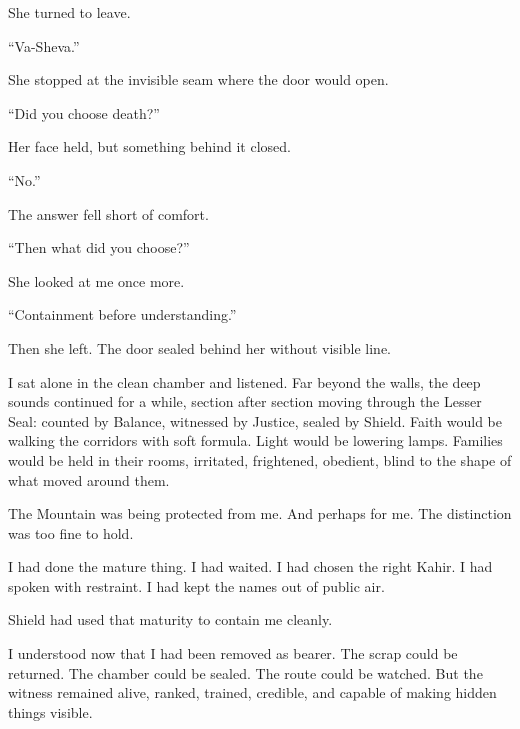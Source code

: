 She turned to leave.\par

``Va-Sheva.''\par

She stopped at the invisible seam where the door would open.\par

``Did you choose death?''\par

Her face held, but something behind it closed.\par

``No.''\par

The answer fell short of comfort.\par

``Then what did you choose?''\par

She looked at me once more.\par

``Containment before understanding.''\par

Then she left. The door sealed behind her without visible line.\par

I sat alone in the clean chamber and listened. Far beyond the walls, the deep sounds continued for a while, section after section moving through the Lesser Seal: counted by Balance, witnessed by Justice, sealed by Shield. Faith would be walking the corridors with soft formula. Light would be lowering lamps. Families would be held in their rooms, irritated, frightened, obedient, blind to the shape of what moved around them.\par

The Mountain was being protected from me. And perhaps for me. The distinction was too fine to hold.\par

I had done the mature thing. I had waited. I had chosen the right Kahir. I had spoken with restraint. I had kept the names out of public air.\par

Shield had used that maturity to contain me cleanly.\par

I understood now that I had been removed as bearer. The scrap could be returned. The chamber could be sealed. The route could be watched. But the witness remained alive, ranked, trained, credible, and capable of making hidden things visible.\par

